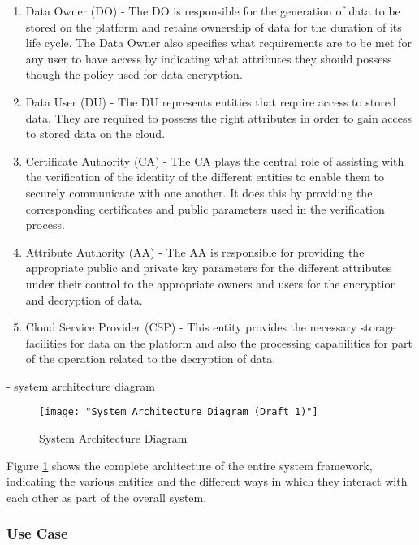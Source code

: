 \begin{enumerate}[label=(\arabic*)]
	\item Data Owner (DO) - The DO is responsible for the generation of data to be stored on the platform and retains ownership of data for the duration of its life cycle. The Data Owner also specifies what requirements are to be met for any user to have access by indicating what attributes they should possess though the policy used for data encryption.
	
	\item Data User (DU) - The DU represents entities that require access to stored data. They are required to possess the right attributes in order to gain access to stored data on the cloud.
	
	\item Certificate Authority (CA) - The CA plays the central role of assisting with the verification of the identity of the different entities to enable them to securely communicate with one another. It does this by providing the corresponding certificates and public parameters used in the verification process.
	
	\item Attribute Authority (AA) - The AA is responsible for providing the appropriate public and private key parameters for the different attributes under their control to the appropriate owners and users for the encryption and decryption of data. 
	
	\item Cloud Service Provider (CSP) - This entity provides the necessary storage facilities for data on the platform and also the processing capabilities for part of the operation related to the decryption of data.
	
\end{enumerate}

- system architecture diagram

\begin{figure}[h]
	\centering
	\texttt{[image: "System Architecture Diagram (Draft 1)"]}
	\caption{System Architecture Diagram}
	\label{fig:sysarch}
\end{figure}

Figure \ref{fig:sysarch} shows the complete architecture of the entire system framework, indicating the various entities and the different ways in which they interact with each other as part of the overall system.


\subsubsection{Use Case}

